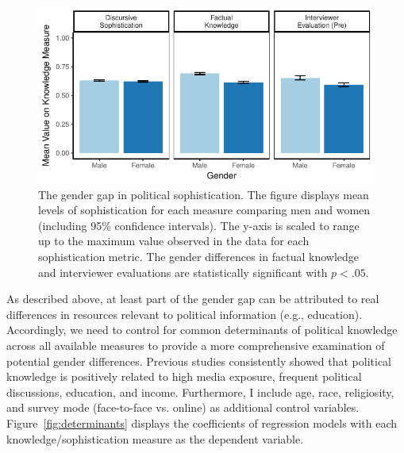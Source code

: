 \documentclass[12pt]{article}
\begin{document}
\begin{figure}[h]\centering
\includegraphics{../fig/meandiff_pres.pdf}
\caption{The gender gap in political sophistication. The figure displays mean levels of sophistication for each measure comparing men and women (including 95\% confidence intervals). The y-axis is scaled to range up to the maximum value observed in the data for each sophistication metric. The gender differences in factual knowledge and interviewer evaluations are statistically significant with $p<.05$.}\label{fig:meandiff}
\end{figure}

As described above, at least part of the gender gap can be attributed to real differences in resources relevant to political information (e.g., education). Accordingly, we need to control for common determinants of political knowledge across all available measures to provide a more comprehensive examination of potential gender differences. Previous studies consistently showed that political knowledge is positively related to high media exposure, frequent political discussions, education, and income. Furthermore, I include age, race, religiosity, and survey mode (face-to-face vs. online) as additional control variables. Figure~\ref{fig:determinants} displays the coefficients of regression models with each knowledge/sophistication measure as the dependent variable.
\end{document}
